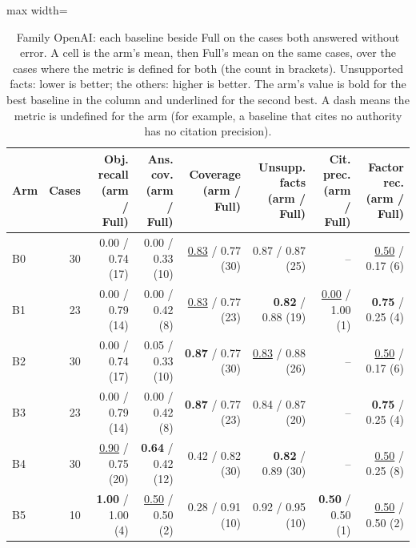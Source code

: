 \begin{table}[t]
\centering\footnotesize
\begin{adjustbox}{max width=\textwidth}
\begin{tabular}{@{}lrrrrrrr@{}}
\toprule
Arm & Cases & Obj. recall (arm / Full) & Ans. cov. (arm / Full) & Coverage (arm / Full) & Unsupp. facts (arm / Full) & Cit. prec. (arm / Full) & Factor rec. (arm / Full) \\
\midrule
B0 & 30 & 0.00 / 0.74 (17) & 0.00 / 0.33 (10) & \underline{0.83} / 0.77 (30) & 0.87 / 0.87 (25) & -- & \underline{0.50} / 0.17 (6) \\
B1 & 23 & 0.00 / 0.79 (14) & 0.00 / 0.42 (8) & \underline{0.83} / 0.77 (23) & \textbf{0.82} / 0.88 (19) & \underline{0.00} / 1.00 (1) & \textbf{0.75} / 0.25 (4) \\
B2 & 30 & 0.00 / 0.74 (17) & 0.05 / 0.33 (10) & \textbf{0.87} / 0.77 (30) & \underline{0.83} / 0.88 (26) & -- & \underline{0.50} / 0.17 (6) \\
B3 & 23 & 0.00 / 0.79 (14) & 0.00 / 0.42 (8) & \textbf{0.87} / 0.77 (23) & 0.84 / 0.87 (20) & -- & \textbf{0.75} / 0.25 (4) \\
B4 & 30 & \underline{0.90} / 0.75 (20) & \textbf{0.64} / 0.42 (12) & 0.42 / 0.82 (30) & \textbf{0.82} / 0.89 (30) & -- & \underline{0.50} / 0.25 (8) \\
B5 & 10 & \textbf{1.00} / 1.00 (4) & \underline{0.50} / 0.50 (2) & 0.28 / 0.91 (10) & 0.92 / 0.95 (10) & \textbf{0.50} / 0.50 (1) & \underline{0.50} / 0.50 (2) \\
\bottomrule
\end{tabular}
\end{adjustbox}
\caption{Family OpenAI: each baseline beside Full on the cases both answered without error. A cell is the arm's mean, then Full's mean on the same cases, over the cases where the metric is defined for both (the count in brackets). Unsupported facts: lower is better; the others: higher is better. The arm's value is bold for the best baseline in the column and underlined for the second best. A dash means the metric is undefined for the arm (for example, a baseline that cites no authority has no citation precision).}
\label{tab:main_openai}
\end{table}